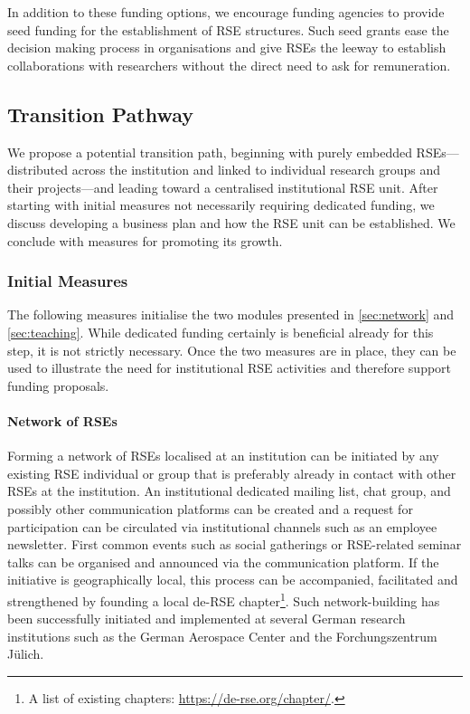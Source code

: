 \documentclass[a4paper]{article}
\begin{document}
In addition to these funding options, we encourage funding agencies to provide seed funding for the establishment of RSE structures.
Such seed grants ease the decision making process in organisations and give RSEs the leeway to establish collaborations with researchers without the direct need to ask for remuneration.

\subsection{Transition Pathway}

We propose a potential transition path, beginning with purely embedded RSEs---distributed across the institution and linked to individual research groups and their projects---and leading toward a centralised institutional RSE unit.
After starting with initial measures not necessarily requiring dedicated funding, we discuss developing a business plan and how the RSE unit can be established.
We conclude with measures for promoting its growth.

\subsubsection{Initial Measures}
The following measures initialise the two modules presented in \autoref{sec:network} and \autoref{sec:teaching}.
While dedicated funding certainly is beneficial already for this step, it is not strictly necessary.
Once the two measures are in place, they can be used to illustrate the need for institutional RSE activities and therefore support funding proposals.

\paragraph{Network of RSEs}
Forming a network of RSEs localised at an institution can be initiated by any existing RSE individual or group that is preferably already in contact with other RSEs at the institution.
An institutional dedicated mailing list, chat group, and possibly other communication platforms can be created and a request for participation can be circulated via institutional channels such as an employee newsletter.
First common events such as social gatherings or RSE-related seminar talks can be organised and announced via the communication platform.
If the initiative is geographically local, this process can be accompanied, facilitated and strengthened by founding a local de-RSE chapter\footnote{A list of existing chapters: \url{https://de-rse.org/chapter/}.}.
Such network-building has been successfully initiated and implemented at several German research institutions such as the German Aerospace Center and the Forchungszentrum Jülich.
\end{document}
